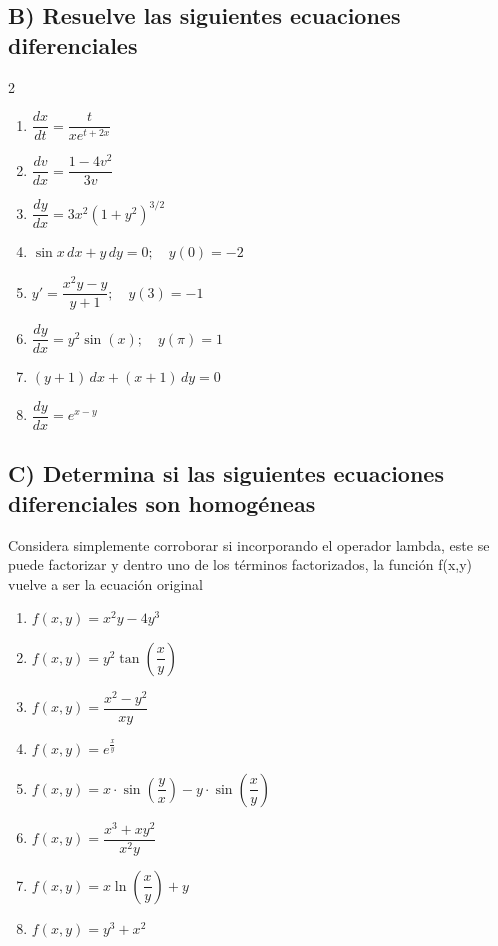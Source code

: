 \documentclass[a4paper,12pt]{article}
\begin{document}
\subsection*{B) Resuelve las siguientes ecuaciones diferenciales}
\begin{multicols}{2}
\begin{enumerate}
    \item $\dfrac{dx}{dt} = \dfrac{t}{x e^{t + 2x}}$
    \item $\dfrac{dv}{dx} = \dfrac{1 - 4v^2}{3v}$
    \item $\dfrac{dy}{dx} = 3x^2(1 + y^2)^{3/2}$
    \item $\sin x \, dx + y \, dy = 0; \quad y(0)=-2$
    \item $y' = \dfrac{x^2 y - y}{y+1}; \quad y(3)=-1$
    \item $\dfrac{dy}{dx} = y^2 \sin(x); \quad y(\pi) = 1$
    \item $(y+1) \, dx + (x+1) \, dy = 0$
    \item $\dfrac{dy}{dx} = e^{x-y}$
\end{enumerate}
\end{multicols}

\subsection*{C) Determina si las siguientes ecuaciones diferenciales son homogéneas}
Considera simplemente corroborar si incorporando el operador lambda, este se puede factorizar y dentro uno de los términos factorizados, la función f(x,y) vuelve a ser la ecuación original

\begin{enumerate}
    \item $f(x,y)=x^{2} y-4y^{3}$
    \item $f(x,y)=y^{2}\tan\left(\dfrac{x}{y}\right)$
    \item $f(x,y)=\dfrac{x^{2} -y^{2}}{xy}$
    \item $f(x,y)=e^{\frac{x}{y}}$
    \item $f(x,y)=x\cdot \sin\left(\dfrac{y}{x}\right) -y\cdot \sin\left(\dfrac{x}{y}\right)$
    \item $f(x,y) = \dfrac{x^3 + xy^2}{x^2 y}$
    \item $f(x,y) = x \ln\left(\dfrac{x}{y}\right) + y$
    \item $f(x,y) = y^3 + x^2$
\end{enumerate}
\end{document}
